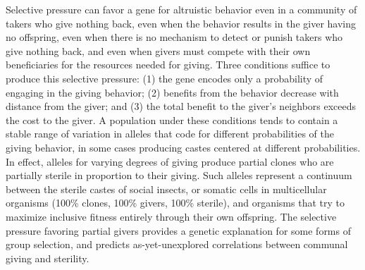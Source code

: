\documentclass{article}
\begin{document}

Selective pressure can favor a gene for altruistic behavior even in a
community of takers who give nothing back, even when the behavior
results in the giver having no offspring, even when there is no
mechanism to detect or punish takers who give nothing back, and even
when givers must compete with their own beneficiaries for the
resources needed for giving. Three conditions suffice to produce this
selective pressure: (1) the gene encodes only a probability of
engaging in the giving behavior; (2) benefits from the behavior
decrease with distance from the giver; and (3) the total benefit to
the giver's neighbors exceeds the cost to the giver. A population
under these conditions tends to contain a stable range of variation in
alleles that code for different probabilities of the giving behavior,
in some cases producing castes centered at different probabilities. In
effect, alleles for varying degrees of giving produce partial clones
who are partially sterile in proportion to their giving. Such alleles
represent a continuum between the sterile castes of social insects, or
somatic cells in multicellular organisms (100\% clones, 100\% givers,
100\% sterile), and organisms that try to maximize inclusive fitness
entirely through their own offspring. The selective pressure favoring
partial givers provides a genetic explanation for some forms of group
selection, and predicts as-yet-unexplored correlations between
communal giving and sterility.
\end{document}
